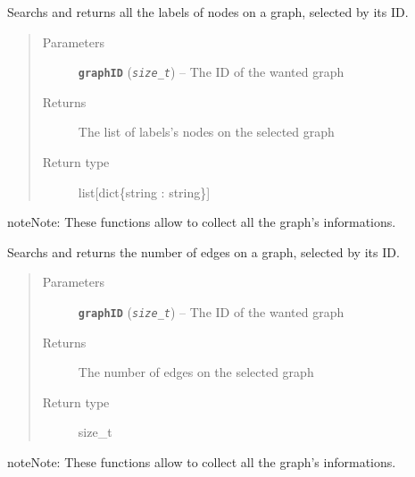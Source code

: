 \documentclass[letterpaper,10pt,english]{sphinxmanual}
\begin{document}

\begin{fulllineitems}
\label{doc:PythonGedLib.PyGetGraphNodeLabels}
Searchs and returns all the labels of nodes on a graph, selected by its ID.
\begin{quote}\begin{description}
\item[{Parameters}] \leavevmode
\textbf{\texttt{graphID}} (\emph{\texttt{size\_t}}) -- The ID of the wanted graph

\item[{Returns}] \leavevmode
The list of labels's nodes on the selected graph

\item[{Return type}] \leavevmode
list{[}dict\{string : string\}{]}

\end{description}\end{quote}

\begin{notice}{note}{Note:}
These functions allow to collect all the graph's informations.
\end{notice}

\end{fulllineitems}


\begin{fulllineitems}
\label{doc:PythonGedLib.PyGetGraphNumEdges}
Searchs and returns the number of edges on a graph, selected by its ID.
\begin{quote}\begin{description}
\item[{Parameters}] \leavevmode
\textbf{\texttt{graphID}} (\emph{\texttt{size\_t}}) -- The ID of the wanted graph

\item[{Returns}] \leavevmode
The number of edges on the selected graph

\item[{Return type}] \leavevmode
size\_t

\end{description}\end{quote}

\begin{notice}{note}{Note:}
These functions allow to collect all the graph's informations.
\end{notice}

\end{fulllineitems}
\end{document}
